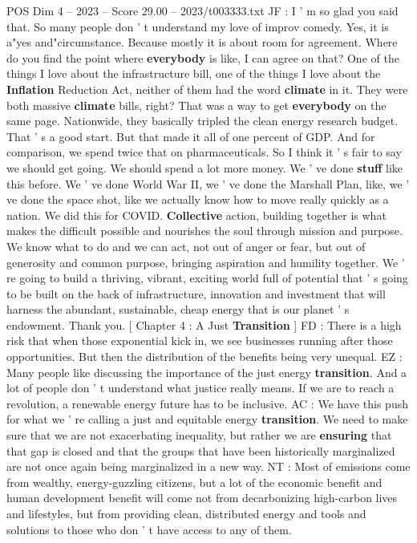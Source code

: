 \begin{textsample}{POS Dim 4 – 2023 – Score 29.00 – 2023/t003333.txt}
JF : I ' m so glad you said that.
So many people don ' t understand my love of improv comedy.
Yes, it is a"yes and"circumstance.
Because mostly it is about room for agreement.
Where do you find the point where \textbf{everybody} is like, I can agree on that?
One of the things I love about the infrastructure bill, one of the things I love about the \textbf{Inflation} Reduction Act, neither of them had the word \textbf{climate} in it.
They were both massive \textbf{climate} bills, right?
That was a way to get \textbf{everybody} on the same page.
Nationwide, they basically tripled the clean energy research budget.
That ' s a good start.
But that made it all of one percent of GDP.
And for comparison, we spend twice that on pharmaceuticals.
So I think it ' s fair to say we should get going.
We should spend a lot more money.
We ' ve done \textbf{stuff} like this before.
We ' ve done World War II, we ' ve done the Marshall Plan, like, we ' ve done the space shot, like we actually know how to move really quickly as a nation.
We did this for COVID. \textbf{Collective} action, building together is what makes the difficult possible and nourishes the soul through mission and purpose.
We know what to do and we can act, not out of anger or fear, but out of generosity and common purpose, bringing aspiration and humility together.
We ' re going to build a thriving, vibrant, exciting world full of potential that ' s going to be built on the back of infrastructure, innovation and investment that will harness the abundant, sustainable, cheap energy that is our planet ' s endowment.
Thank you. [ Chapter 4 : A Just \textbf{Transition} ] FD : There is a high risk that when those exponential kick in, we see businesses running after those opportunities.
But then the distribution of the benefits being very unequal.
EZ : Many people like discussing the importance of the just energy \textbf{transition}.
And a lot of people don ' t understand what justice really means.
If we are to reach a revolution, a renewable energy future has to be inclusive.
AC : We have this push for what we ' re calling a just and equitable energy \textbf{transition}.
We need to make sure that we are not exacerbating inequality, but rather we are \textbf{ensuring} that that gap is closed and that the groups that have been historically marginalized are not once again being marginalized in a new way.
NT : Most of emissions come from wealthy, energy-guzzling citizens, but a lot of the economic benefit and human development benefit will come not from decarbonizing high-carbon lives and lifestyles, but from providing clean, distributed energy and tools and solutions to those who don ' t have access to any of them.

\end{textsample}
